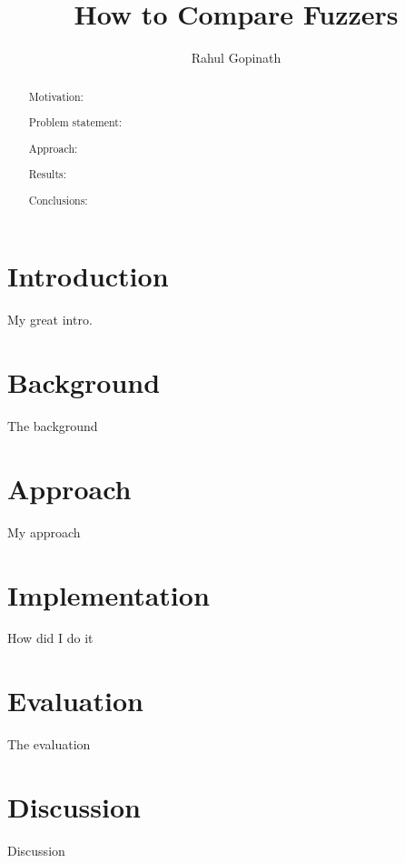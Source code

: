 \documentclass[sigconf,dvipsnames]{acmart}
\newcommand{\mytitle}{How to Compare Fuzzers}
\begin{document}
\fancyhead{}
\title{\mytitle}

\author{Rahul Gopinath}


\date{}


\begin{abstract}
Motivation: 

Problem statement: 

Approach: 

Results: 

Conclusions: 
\end{abstract}

\maketitle

\section{Introduction}
\label{sec:intro}
My great intro.
\section{Background}
\label{sec:background}
The background
\section{Approach}
\label{sec:approach}

My approach

\section{Implementation}
\label{sec:implementation}
How did I do it
\section{Evaluation}
\label{sec:evaluation}
The evaluation

\section{Discussion}
\label{sec:discussion}
Discussion



\end{document}
